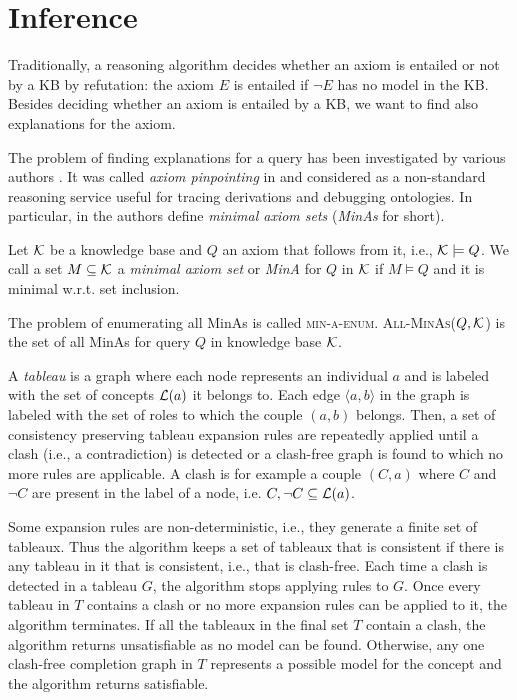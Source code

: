 \section{Inference}
\label{inf}

Traditionally, a reasoning algorithm decides  whether an axiom is entailed or not by a KB by refutation: the  axiom $E$ is entailed if $\neg E$ has no model
in the KB.
Besides deciding whether an axiom is entailed by a KB, we want to find also explanations for the axiom.

The problem of finding  explanations for a query
has been investigated by various authors \cite{DBLP:conf/ijcai/SchlobachC03,DBLP:journals/ws/KalyanpurPSH05,DBLP:conf/semweb/KalyanpurPHS07,Kalyanpurphd,extended_tracing,Zese17-SSW-BK}.
 It was called  \emph{axiom pinpointing} in 
\cite{DBLP:conf/ijcai/SchlobachC03}  and considered as a non-standard reasoning service useful for tracing derivations and debugging ontologies. 
In particular, in \cite{DBLP:conf/ijcai/SchlobachC03} the authors define \emph{minimal axiom sets}  (\emph{MinAs} for short).
\begin{definition}[MinA]
 Let ${\cal K}$ be a knowledge base and $Q$ an
axiom that follows from it, i.e., 
${\cal K} \models Q$. We call a set 
$M\subseteq {\cal K}$ a
\emph{minimal axiom set} or \emph{MinA} for $Q$ in ${\cal K}$ if 
$M \models Q$ and it is minimal
w.r.t. set inclusion.
\end{definition}  
\noindent The problem of enumerating all MinAs is called \textsc{min-a-enum}.
\textsc{All-MinAs($Q,{\cal K}$)} is the set of all MinAs for query $Q$ in knowledge base ${\cal K}$.

A \emph{tableau} is a graph where each node represents an
individual $a$ and is labeled with the set of concepts ${\cal L}(a)$ it belongs to. Each
edge $\langle a, b\rangle$ in the graph is labeled with the set of roles to which the couple
$(a, b)$ belongs. Then, a set of  consistency preserving tableau
expansion rules are repeatedly applied until a clash (i.e., a contradiction) is detected or a clash-free
graph is found to which no more rules are applicable. A clash is for example a
couple $(C, a)$ where $C$ and $\neg C$ are present in the label of a node, i.e. ${C, \neg C} \subseteq {\cal L}(a)$.

Some expansion rules are non-deterministic, i.e., they generate
a finite set of tableaux. Thus the algorithm keeps a set of tableaux that is
consistent if there is any tableau in it that is consistent, i.e., that is clash-free.
Each time a clash is detected in a tableau $G$, the algorithm stops applying rules
to $G$. Once every tableau in $T$ contains a clash or no more expansion rules
can be applied to it, the algorithm terminates. If all the tableaux in the final
set $T$ contain a clash, the algorithm returns unsatisfiable as no model can be
found. Otherwise, any one clash-free completion graph in $T$ represents a possible
model for the concept and the algorithm returns satisfiable.


